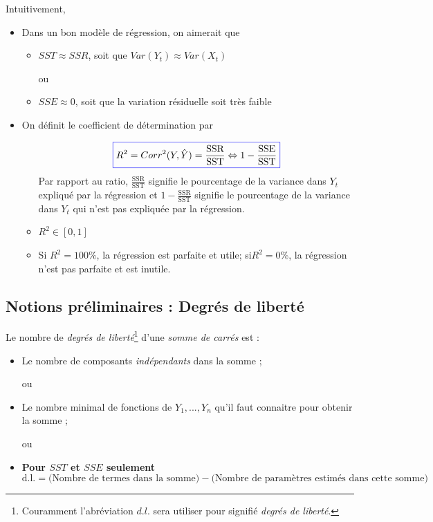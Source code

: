 \documentclass[11pt,french]{report}
\begin{document}
Intuitivement, 
\begin{itemize}
     \item Dans un bon modèle de régression, on aimerait que 
          \begin{itemize}
          \item $SST \approx SSR$, soit que $Var(Y_t) \approx Var(X_t)$ 
          \item[ou]
          \item $SSE \approx 0$, soit que la variation résiduelle soit très faible
          \end{itemize}
     \item On définit le coefficient de détermination par
          \begin{itemize}
          
          \item[]\begin{equation}
          \label{eq:R}
          \color{blue}
          \boxed{\color{black}
          R^2 = Corr^2(Y, \hat{Y}) = \frac{\text{SSR}}{\text{SST}} \Leftrightarrow 1 - \frac{\text{SSE}}{\text{SST}}}
          \end{equation}
          Par rapport au ratio, $\frac{\text{SSR}}{\text{SST}}$ signifie le pourcentage de la variance dans $Y_t$ expliqué par la régression et 
          $1 - \frac{\text{SSR}}{\text{SST}}$ signifie le pourcentage de la variance dans $Y_t$ qui n'est pas expliquée par la régression.
          \item $R^2 \in [0,1] $
          \item Si $R^2 = 100 \%$, la régression est parfaite et utile; si$R^2 = 0 \%$, la régression n'est pas parfaite et est inutile.
          \end{itemize}
\end{itemize}

\subsection{Notions préliminaires : Degrés de liberté}
Le nombre de \emph{degrés de liberté}\footnote{Couramment l'abréviation $d.l.$ sera utiliser pour signifié \emph{degrés de liberté}.} d'une \emph{somme de carrés} est :
\begin{itemize}
     \item Le nombre de composants \emph{indépendants} dans la somme ;
     \item[ou]
     \item Le nombre minimal de fonctions de $Y_1, ..., Y_n$ qu'il faut connaitre pour obtenir la somme ;
     \item[ou]
     \item \textbf{Pour $SST$ et $SSE$ seulement}
     $$
     \text{d.l.} = \Big( \text{Nombre de termes dans la somme}\Big) - \Big( \text{Nombre de paramètres estimés dans cette somme}\Big)
     $$
\end{itemize}
\end{document}
